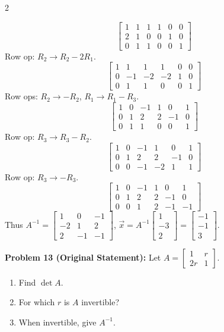 \documentclass[8pt]{extarticle}
\begin{document}
\begin{multicols}{2}
\begin{tcolorbox}[title=]
\[
\left[
\begin{array}{ccc|ccc}
1&1&1&1&0&0\\
2&1&0&0&1&0\\
0&1&1&0&0&1
\end{array}
\right]
\]
Row op: \(R_2\to R_2-2R_1\).
\[
\left[
\begin{array}{ccc|ccc}
1&1&1&1&0&0\\
0&-1&-2&-2&1&0\\
0&1&1&0&0&1
\end{array}
\right]
\]
Row ops: \(R_2\to -R_2\), \(R_1\to R_1-R_3\).
\[
\left[
\begin{array}{ccc|ccc}
1&0&-1&1&0&1\\
0&1&2&2&-1&0\\
0&1&1&0&0&1
\end{array}
\right]
\]
Row op: \(R_3\to R_3-R_2\).
\[
\left[
\begin{array}{ccc|ccc}
1&0&-1&1&0&1\\
0&1&2&2&-1&0\\
0&0&-1&-2&1&1
\end{array}
\right]
\]
Row op: \(R_3\to -R_3\).
\[
\left[
\begin{array}{ccc|ccc}
1&0&-1&1&0&1\\
0&1&2&2&-1&0\\
0&0&1&2&-1&-1
\end{array}
\right]
\]
Thus
\(A^{-1}=\begin{bmatrix}1&0&-1\\-2&1&2\\2&-1&-1\end{bmatrix}\),
\(
\vec{x}=A^{-1}\!\begin{bmatrix}1\\-3\\2\end{bmatrix}
=\begin{bmatrix}-1\\-1\\3\end{bmatrix}.
\)
\end{tcolorbox}

\begin{tcolorbox}[title=]
\noindent
\textbf{Problem 13 (Original Statement):}
Let
\(A=\begin{bmatrix}1&r\\2r&1\end{bmatrix}\).
\begin{enumerate}
\item[(a)] Find \(\det A\).
\item[(b)] For which \(r\) is \(A\) invertible?
\item[(c)] When invertible, give \(A^{-1}\).
\end{enumerate}


\end{tcolorbox}
\end{multicols}
\end{document}
